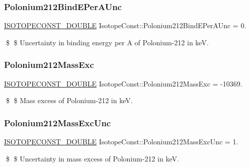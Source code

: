 \subsubsection{\texorpdfstring{Polonium212\+Bind\+E\+Per\+A\+Unc}{Polonium212BindEPerAUnc}}
{\footnotesize\ttfamily \mbox{\hyperlink{group___isotope_const-_macros_ga8f45a7272ce02c0b4c65c44636ed719a}{I\+S\+O\+T\+O\+P\+E\+C\+O\+N\+S\+T\+\_\+\+D\+O\+U\+B\+LE}} Isotope\+Const\+::\+Polonium212\+Bind\+E\+Per\+A\+Unc = 0.}

\$ \$ Uncertainty in binding energy per A of Polonium-\/212 in keV. \mbox{\label{group___isotope_const-_polonium-_po212_ga3db0cef7464b4de28cf2668ef6c95230}} 
\subsubsection{\texorpdfstring{Polonium212\+Mass\+Exc}{Polonium212MassExc}}
{\footnotesize\ttfamily \mbox{\hyperlink{group___isotope_const-_macros_ga8f45a7272ce02c0b4c65c44636ed719a}{I\+S\+O\+T\+O\+P\+E\+C\+O\+N\+S\+T\+\_\+\+D\+O\+U\+B\+LE}} Isotope\+Const\+::\+Polonium212\+Mass\+Exc = -\/10369.}

\$ \$ Mass excess of Polonium-\/212 in keV. \mbox{\label{group___isotope_const-_polonium-_po212_ga8760d4272fa8078d3e9d256db9de3ea0}} 
\subsubsection{\texorpdfstring{Polonium212\+Mass\+Exc\+Unc}{Polonium212MassExcUnc}}
{\footnotesize\ttfamily \mbox{\hyperlink{group___isotope_const-_macros_ga8f45a7272ce02c0b4c65c44636ed719a}{I\+S\+O\+T\+O\+P\+E\+C\+O\+N\+S\+T\+\_\+\+D\+O\+U\+B\+LE}} Isotope\+Const\+::\+Polonium212\+Mass\+Exc\+Unc = 1.}

\$ \$ Uncertainty in mass excess of Polonium-\/212 in keV. \mbox{\label{group___isotope_const-_polonium-_po212_gaa916327aff13f9fdb0c9649dc3533b51}} 
